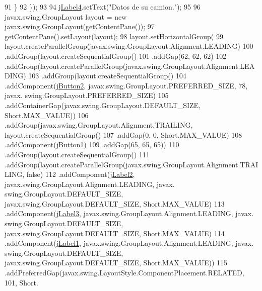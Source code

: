\begin{DoxyCode}
91             \}
92         \});
93 
94         \mbox{\hyperlink{classejercicio2_1_1_camion_interfaz_a4a08e18cef32cc5cc683a2d882e3fdcb}{jLabel4}}.setText(\textcolor{stringliteral}{"Datos de su camion."});
95 
96         javax.swing.GroupLayout layout = \textcolor{keyword}{new} javax.swing.GroupLayout(getContentPane());
97         getContentPane().setLayout(layout);
98         layout.setHorizontalGroup(
99             layout.createParallelGroup(javax.swing.GroupLayout.Alignment.LEADING)
100             .addGroup(layout.createSequentialGroup()
101                 .addGap(62, 62, 62)
102                 .addGroup(layout.createParallelGroup(javax.swing.GroupLayout.Alignment.LEADING)
103                     .addGroup(layout.createSequentialGroup()
104                         .addComponent(\mbox{\hyperlink{classejercicio2_1_1_camion_interfaz_aa5f586a69f5266a210a12f6873d21657}{jButton2}}, javax.swing.GroupLayout.PREFERRED\_SIZE, 78, javax.
      swing.GroupLayout.PREFERRED\_SIZE)
105                         .addContainerGap(javax.swing.GroupLayout.DEFAULT\_SIZE, Short.MAX\_VALUE))
106                     .addGroup(javax.swing.GroupLayout.Alignment.TRAILING, layout.createSequentialGroup()
107                         .addGap(0, 0, Short.MAX\_VALUE)
108                         .addComponent(\mbox{\hyperlink{classejercicio2_1_1_camion_interfaz_a782e2170ce45db1bd1d32b61d1d7be8c}{jButton1}})
109                         .addGap(65, 65, 65))
110                     .addGroup(layout.createSequentialGroup()
111                         .addGroup(layout.createParallelGroup(javax.swing.GroupLayout.Alignment.TRAILING, \textcolor{keyword}{
      false})
112                             .addComponent(\mbox{\hyperlink{classejercicio2_1_1_camion_interfaz_a4a0e429b6f6d6aeb7911a2e89cfcf384}{jLabel2}}, javax.swing.GroupLayout.Alignment.LEADING, javax.
      swing.GroupLayout.DEFAULT\_SIZE, javax.swing.GroupLayout.DEFAULT\_SIZE, Short.MAX\_VALUE)
113                             .addComponent(\mbox{\hyperlink{classejercicio2_1_1_camion_interfaz_a13844a46462d16486b33610dc0c6bb47}{jLabel3}}, javax.swing.GroupLayout.Alignment.LEADING, javax.
      swing.GroupLayout.DEFAULT\_SIZE, javax.swing.GroupLayout.DEFAULT\_SIZE, Short.MAX\_VALUE)
114                             .addComponent(\mbox{\hyperlink{classejercicio2_1_1_camion_interfaz_a490011dc597ba9415392ffbe2ad78bce}{jLabel1}}, javax.swing.GroupLayout.Alignment.LEADING, javax.
      swing.GroupLayout.DEFAULT\_SIZE, javax.swing.GroupLayout.DEFAULT\_SIZE, Short.MAX\_VALUE))
115                         .addPreferredGap(javax.swing.LayoutStyle.ComponentPlacement.RELATED, 101, Short.

\end{DoxyCode}
